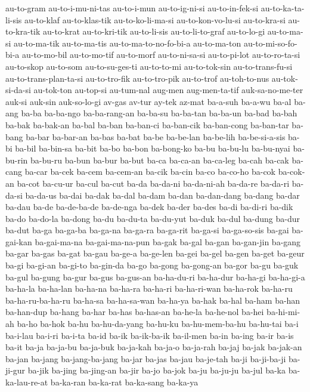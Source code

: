 {au-to-gram au-to-i-mu-ni-tas au-to-i-mun au-to-ig-ni-si au-to-in-fek-si
au-to-ka-ta-li-sis au-to-klaf au-to-klas-tik au-to-ko-li-ma-si
au-to-kon-vo-lu-si au-to-kra-si au-to-kra-tik au-to-krat au-to-kri-tik
au-to-li-sis au-to-li-to-graf au-to-lo-gi au-to-ma-si au-to-ma-tik
au-to-ma-tis au-to-ma-to-no-fo-bi-a au-to-ma-ton au-to-mi-so-fo-bi-a
au-to-mo-bil au-to-mo-tif au-to-morf au-to-ni-sa-si au-to-pi-lot
au-to-ro-ta-si au-to-skop au-to-som au-to-su-ges-ti au-to-to-mi
au-to-tok-sin au-to-trans-fu-si au-to-trans-plan-ta-si au-to-tro-fik
au-to-tro-pik au-to-trof au-toh-to-nus au-tok-si-da-si au-tok-ton
au-top-si au-tum-nal aug-men aug-men-ta-tif auk-sa-no-me-ter auk-si
auk-sin auk-so-lo-gi av-gas av-tur ay-tek az-mat ba-a-suh ba-a-wu ba-al
ba-ang ba-ba ba-ba-ngo ba-ba-rang-an ba-ba-su ba-ba-tan ba-ba-un ba-bad
ba-bah ba-bak ba-bak-an ba-bal ba-ban ba-ban-ci ba-ban-cik ba-ban-cong
ba-ban-tar ba-bang ba-bar ba-bar-an ba-bas ba-bat ba-be ba-be-lan
ba-be-lih ba-be-si-a-sis ba-bi ba-bil ba-bin-sa ba-bit ba-bo ba-bon
ba-bong-ko ba-bu ba-bu-lu ba-bu-nyai ba-bu-rin ba-bu-ru ba-bun ba-bur
ba-but ba-ca ba-ca-an ba-ca-leg ba-cah ba-cak ba-cang ba-car ba-cek ba-cem
ba-cem-an ba-cik ba-cin ba-co ba-co-ho ba-cok ba-cok-an ba-cot ba-cu-ur
ba-cul ba-cut ba-da ba-da-ni ba-da-ni-ah ba-da-re ba-da-ri ba-da-si
ba-da-us ba-dai ba-dak ba-dal ba-dam ba-dan ba-dan-dang ba-dang ba-dar
ba-dau ba-de ba-de-ba-de ba-de-nga ba-dek ba-der ba-des ba-di ba-di-ri
ba-dik ba-do ba-do-la ba-dong ba-du ba-du-ta ba-du-yut ba-duk ba-dul
ba-dung ba-dur ba-dut ba-ga ba-ga-ba ba-ga-na ba-ga-ra ba-ga-rit ba-ga-si
ba-ga-so-sis ba-gai ba-gai-kan ba-gai-ma-na ba-gai-ma-na-pun ba-gak ba-gal
ba-gan ba-gan-jin ba-gang ba-gar ba-gas ba-gat ba-gau ba-ge-a ba-ge-len
ba-gei ba-gel ba-gen ba-get ba-geur ba-gi ba-gi-an ba-gi-to ba-gin-da
ba-go ba-gong ba-gong-an ba-gor ba-gu ba-guk ba-gul ba-gung ba-gur ba-gus
ba-gus-an ba-ha-du-ri ba-ha-dur ba-ha-gi ba-ha-gi-a ba-ha-la ba-ha-lan
ba-ha-na ba-ha-ra ba-ha-ri ba-ha-ri-wan ba-ha-rok ba-ha-ru
ba-ha-ru-ba-ha-ru ba-ha-sa ba-ha-sa-wan ba-ha-ya ba-hak ba-hal ba-ham
ba-han ba-han-dup ba-hang ba-har ba-has ba-has-an ba-he-la ba-he-nol
ba-hei ba-hi-mi-ah ba-ho ba-hok ba-hu ba-hu-da-yang ba-hu-ku
ba-hu-mem-ba-hu ba-hu-tai ba-i ba-i-lau ba-i-ri ba-i-ta ba-id ba-ik
ba-ik-ba-ik ba-il-men ba-in ba-ing ba-ir ba-is ba-it ba-ja ba-ja-bu
ba-ja-buk ba-ja-kah ba-ja-o ba-ja-rah ba-jaj ba-jak ba-jak-an ba-jan
ba-jang ba-jang-ba-jang ba-jar ba-jas ba-jau ba-je-tah ba-ji ba-ji-ba-ji
ba-ji-gur ba-jik ba-jing ba-jing-an ba-jir ba-jo ba-jok ba-ju ba-ju-ju
ba-jul ba-ka ba-ka-lau-re-at ba-ka-ran ba-ka-rat ba-ka-sang ba-ka-ya
}
